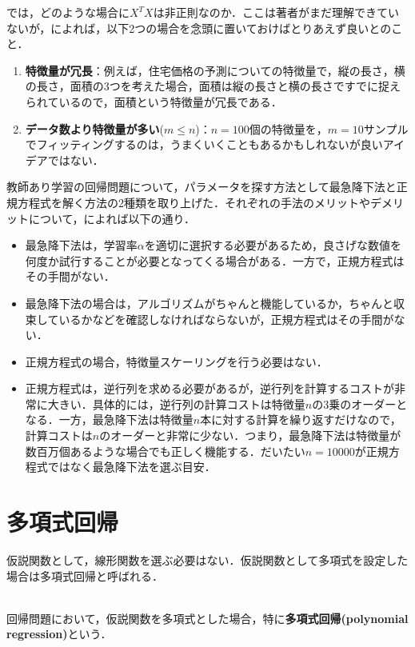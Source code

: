 では，どのような場合に$X^TX$は非正則なのか．ここは著者がまだ理解できていないが，\cite{AndrewML}によれば，以下2つの場合を念頭に置いておけばとりあえず良いとのこと．
\begin{enumerate}
\item {\bf 特徴量が冗長}：例えば，住宅価格の予測についての特徴量で，縦の長さ，横の長さ，面積の3つを考えた場合，面積は縦の長さと横の長さですでに捉えられているので，面積という特徴量が冗長である．
\item {\bf データ数より特徴量が多い}($m \leq n$)：$n=100$個の特徴量を，$m=10$サンプルでフィッティングするのは，うまくいくこともあるかもしれないが良いアイデアではない．
\end{enumerate}


教師あり学習の回帰問題について，パラメータを探す方法として最急降下法と正規方程式を解く方法の2種類を取り上げた．それぞれの手法のメリットやデメリットについて，\cite{AndrewML}によれば以下の通り．
\begin{itemize}
\item 最急降下法は，学習率$\alpha $を適切に選択する必要があるため，良さげな数値を何度か試行することが必要となってくる場合がある．一方で，正規方程式はその手間がない．
\item 最急降下法の場合は，アルゴリズムがちゃんと機能しているか，ちゃんと収束しているかなどを確認しなければならないが，正規方程式はその手間がない．
\item 正規方程式の場合，特徴量スケーリングを行う必要はない．
\item 正規方程式は，逆行列を求める必要があるが，逆行列を計算するコストが非常に大きい．具体的には，逆行列の計算コストは特徴量$n$の3乗のオーダーとなる．一方，最急降下法は特徴量$n$本に対する計算を繰り返すだけなので，計算コストは$n$のオーダーと非常に少ない．つまり，最急降下法は特徴量が数百万個あるような場合でも正しく機能する．だいたい$n=10000$が正規方程式ではなく最急降下法を選ぶ目安．
\end{itemize}

\section{多項式回帰}

仮説関数として，線形関数を選ぶ必要はない．仮説関数として多項式を設定した場合は多項式回帰と呼ばれる．
\begin{defi}[多項式回帰]
　\\
回帰問題において，仮説関数を多項式とした場合，特に{\bf 多項式回帰(polynomial regression)}という．
\end{defi}

